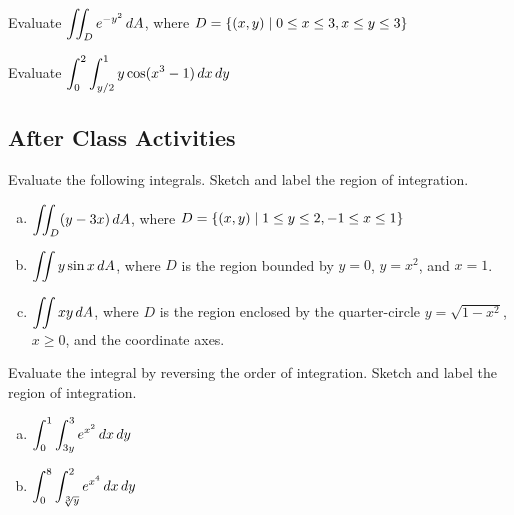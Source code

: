 \documentclass[notes]{subfiles}
\begin{document}
			\begin{ex}
				Evaluate $\displaystyle \iint_D e^{-y^2}\, dA$, where $D = \left\lbrace (x,y)\mid 0\leq x \leq 3, x\leq y \leq 3 \right\rbrace$
			\end{ex}
				
			\begin{ex}
				Evaluate $\displaystyle \int_0^2\int_{y/2}^1 y\cos (x^3-1)\, dx\, dy$
			\end{ex}
			
			
			
	\subsection*{After Class Activities}
	
		\begin{ex}
			Evaluate the following integrals. Sketch and label the region of integration.
			\begin{enumerate}[(a)]
				\item $\displaystyle \iint_D (y-3x)\, dA$, where $D = \left\lbrace (x,y)\mid 1\leq y\leq 2, -1\leq x\leq 1 \right\rbrace$
					
				\item $\displaystyle \iint y\sin x\, dA$, where $D$ is the region bounded by $y = 0$,  $y = x^2$, and $x= 1$.
					
				\item $\displaystyle \iint xy\, dA$, where $D$ is the region enclosed by the quarter-circle $y = \sqrt{1-x^2}$, $x\geq 0$, and the coordinate axes.
			\end{enumerate}
		\end{ex}
		
		\begin{ex}
			Evaluate the integral by reversing the order of integration. Sketch and label the region of integration.
			\begin{enumerate}[(a)]
				\item $\displaystyle \int_0^1\int_{3y}^3 e^{x^2}\, dx\, dy$
					\vs{1}
					
				\item $\displaystyle \int_0^8 \int_{\sqrt[3]{y}}^2 e^{x^4}\, dx\, dy$
					\vs{1}
			\end{enumerate}
		\end{ex}
		
	\clearpage
\end{document}
